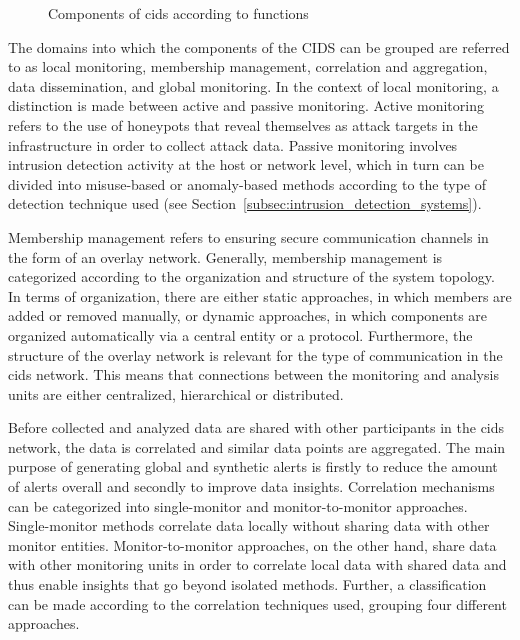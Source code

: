 \begin{figure}[t]
    \centering
    
    \caption{Components of \gls{cids} according to functions}
    \label{fig:cids_components}
\end{figure}

The domains into which the components of the CIDS can be grouped are referred to as local monitoring, membership management, correlation and aggregation, data dissemination, and global monitoring. In the context of local monitoring, a distinction is made between active and passive monitoring. Active monitoring refers to the use of honeypots that reveal themselves as attack targets in the infrastructure in order to collect attack data. Passive monitoring involves intrusion detection activity at the host or network level, which in turn can be divided into misuse-based or anomaly-based methods according to the type of detection technique used (see Section~\ref{subsec:intrusion_detection_systems}). 

Membership management refers to ensuring secure communication channels in the form of an overlay network. Generally, membership management is categorized according to the organization and structure of the system topology. In terms of organization, there are either static approaches, in which members are added or removed manually, or dynamic approaches, in which components are organized automatically via a central entity or a protocol. Furthermore, the structure of the overlay network is relevant for the type of communication in the \gls{cids} network. This means that connections between the monitoring and analysis units are either centralized, hierarchical or distributed. 

Before collected and analyzed data are shared with other participants in the \gls{cids} network, the data is correlated and similar data points are aggregated. The main purpose of generating global and synthetic alerts is firstly to reduce the amount of alerts overall and secondly to improve data insights. Correlation mechanisms can be categorized into single-monitor and monitor-to-monitor approaches. Single-monitor methods correlate data locally without sharing data with other monitor entities. Monitor-to-monitor approaches, on the other hand, share data with other monitoring units in order to correlate local data with shared data and thus enable insights that go beyond isolated methods. Further, a classification can be made according to the correlation techniques used, grouping four different approaches.

